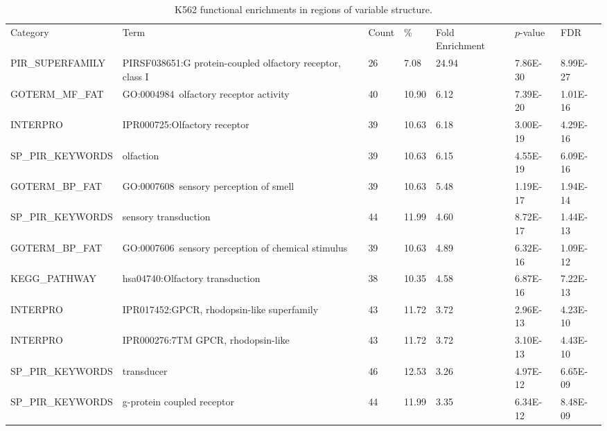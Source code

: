 \documentclass[a4paper,10pt,oneside]{book}
\begin{document}
\clearpage

{\scriptsize 
\begin{longtable}{lllllll}
\caption{
K562 functional enrichments in regions of variable structure.
}\\
\endfirsthead

Category          & Term
& Count & \%    & Fold Enrichment & $p$-value   & FDR      \\
PIR\_SUPERFAMILY  & PIRSF038651:G protein-coupled olfactory receptor, class I       & 26    & 7.08  & 24.94           & 7.86E-30 & 8.99E-27 \\
GOTERM\_MF\_FAT   & GO:0004984~olfactory receptor activity                          & 40    & 10.90 & 6.12            & 7.39E-20 & 1.01E-16 \\
INTERPRO          & IPR000725:Olfactory receptor                                    & 39    & 10.63 & 6.18            & 3.00E-19 & 4.29E-16 \\
SP\_PIR\_KEYWORDS & olfaction                                                       & 39    & 10.63 & 6.15            & 4.55E-19 & 6.09E-16 \\
GOTERM\_BP\_FAT   & GO:0007608~sensory perception of smell                          & 39    & 10.63 & 5.48            & 1.19E-17 & 1.94E-14 \\
SP\_PIR\_KEYWORDS & sensory transduction                                            & 44    & 11.99 & 4.60            & 8.72E-17 & 1.44E-13 \\
GOTERM\_BP\_FAT   & GO:0007606~sensory perception of chemical stimulus              & 39    & 10.63 & 4.89            & 6.32E-16 & 1.09E-12 \\
KEGG\_PATHWAY     & hsa04740:Olfactory transduction                                 & 38    & 10.35 & 4.58            & 6.87E-16 & 7.22E-13 \\
INTERPRO          & IPR017452:GPCR, rhodopsin-like superfamily                      & 43    & 11.72 & 3.72            & 2.96E-13 & 4.23E-10 \\
INTERPRO          & IPR000276:7TM GPCR, rhodopsin-like                              & 43    & 11.72 & 3.72            & 3.10E-13 & 4.43E-10 \\
SP\_PIR\_KEYWORDS & transducer                                                      & 46    & 12.53 & 3.26            & 4.97E-12 & 6.65E-09 \\
SP\_PIR\_KEYWORDS & g-protein coupled receptor                                      & 44    & 11.99 & 3.35            & 6.34E-12 & 8.48E-09 \\

\end{longtable}}
\end{document}
